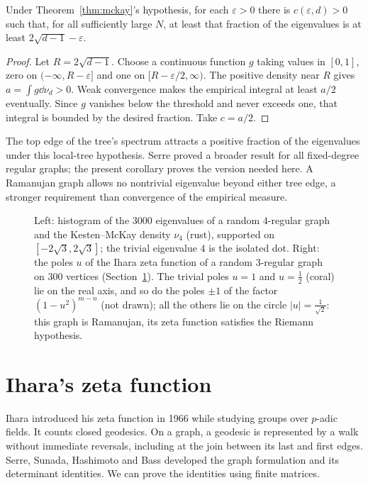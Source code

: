 \begin{corollary}\label{cor:serre}
Under Theorem~\ref{thm:mckay}'s hypothesis, for each $\varepsilon>0$ there is $c(\varepsilon,d)>0$ such that, for all sufficiently large $N$, at least that fraction of the eigenvalues is at least $2\sqrt{d-1}-\varepsilon$.
\end{corollary}
\begin{proof}
Let $R=2\sqrt{d-1}$. Choose a continuous function $g$ taking values in $[0,1]$, zero on $(-\infty,R-\varepsilon]$ and one on $[R-\varepsilon/2,\infty)$. The positive density near $R$ gives $a=\int g\dd\nu_d>0$. Weak convergence makes the empirical integral at least $a/2$ eventually. Since $g$ vanishes below the threshold and never exceeds one, that integral is bounded by the desired fraction. Take $c=a/2$.
\end{proof}

The top edge of the tree's spectrum attracts a positive fraction of the eigenvalues under this local-tree hypothesis. Serre proved a broader result for all fixed-degree regular graphs; the present corollary proves the version needed here. A Ramanujan graph allows no nontrivial eigenvalue beyond either tree edge, a stronger requirement than convergence of the empirical measure.

\begin{figure}[ht]
\centering
{}
\caption{Left: histogram of the $3000$ eigenvalues of a random $4$-regular graph and the Kesten--McKay density $\nu_4$ (rust), supported on $[-2\sqrt3,2\sqrt3]$; the trivial eigenvalue $4$ is the isolated dot. Right: the
poles $u$ of the Ihara zeta function of a random $3$-regular graph on $300$ vertices (Section~\ref{sec:ihara}). The trivial poles $u=1$ and $u=\frac12$ (coral) lie on the real axis, and so do the poles $\pm1$ of the factor $(1-u^2)^{m-n}$ (not drawn); all the others lie on the circle
$|u|=\frac1{\sqrt2}$: this graph is Ramanujan, its zeta function satisfies the Riemann hypothesis.}
\label{fig:kestenmckay}
\end{figure}

\section{Ihara's zeta function}\label{sec:ihara}

Ihara introduced his zeta function in 1966 while studying groups over $p$-adic fields. It counts closed geodesics. On a graph, a geodesic is represented by a walk without immediate reversals, including at the join between its last and first edges. Serre, Sunada, Hashimoto and Bass developed the graph formulation and its determinant identities. We can prove the identities using finite matrices.

